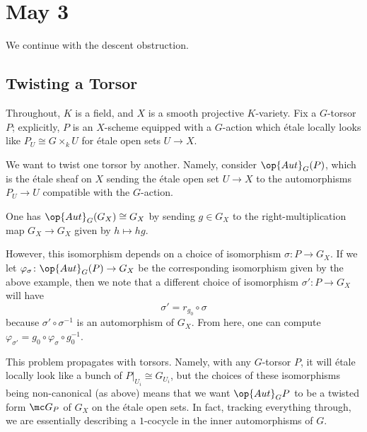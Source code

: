 \documentclass[../notes.tex]{subfiles}
\begin{document}
\section{May 3}

We continue with the descent obstruction.

\subsection{Twisting a Torsor}
Throughout, $K$ is a field, and $X$ is a smooth projective $K$-variety. Fix a $G$-torsor $P$; explicitly, $P$ is an $X$-scheme equipped with a $G$-action which \'etale locally looks like $P_U\cong G\times_kU$ for \'etale open sets $U\to X$.

We want to twist one torsor by another. Namely, consider $\op{Aut}_G(P)$, which is the \'etale sheaf on $X$ sending the \'etale open set $U\to X$ to the automorphisms $P_U\to U$ compatible with the $G$-action.
\begin{example}
	One has $\op{Aut}_G(G_X)\cong G_X$ by sending $g\in G_X$ to the right-multiplication map $G_X\to G_X$ given by $h\mapsto hg$.
\end{example}
However, this isomorphism depends on a choice of isomorphism $\sigma\colon P\to G_X$. If we let $\varphi_\sigma\colon\op{Aut}_G(P)\to G_X$ be the corresponding isomorphism given by the above example, then we note that a different choice of isomorphism $\sigma'\colon P\to G_X$ will have
\[\sigma'=r_{g_0}\circ\sigma\]
because $\sigma'\circ\sigma^{-1}$ is an automorphism of $G_X$. From here, one can compute $\varphi_{\sigma'}=g_0\circ\varphi_\sigma\circ g_0^{-1}$.

This problem propagates with torsors. Namely, with any $G$-torsor $P$, it will \'etale locally look like a bunch of $P|_{U_i}\cong G_{U_i}$, but the choices of these isomorphisms being non-canonical (as above) means that we want $\op{Aut}_GP$ to be a twisted form $\mc G_P$ of $G_X$ on the \'etale open sets. In fact, tracking everything through, we are essentially describing a $1$-cocycle in the inner automorphisms of $G$.
\end{document}
